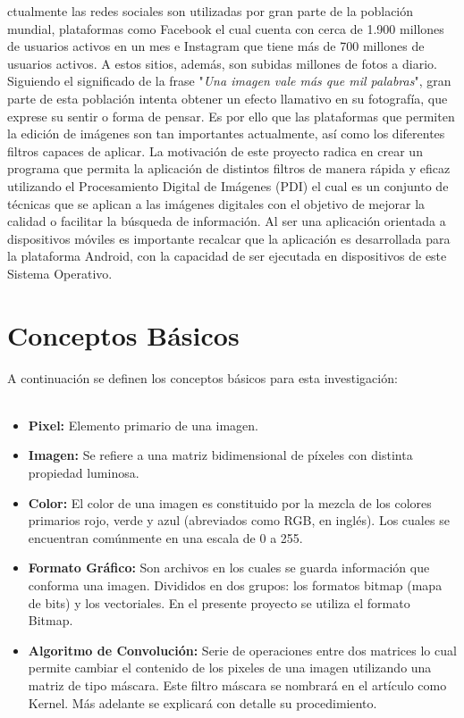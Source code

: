 \documentclass[journal]{IEEEtran}
\begin{document}
ctualmente las redes sociales son utilizadas por gran parte de la población mundial, plataformas como Facebook el cual cuenta con cerca de 1.900 millones de usuarios activos en un mes e Instagram que tiene más de 700 millones de usuarios activos. A estos sitios, además, son subidas millones de fotos a diario. Siguiendo el significado de la frase "\textit{Una imagen vale más que mil palabras}", gran parte de esta población intenta obtener un efecto llamativo en su fotografía, que exprese su sentir o forma de pensar. Es por ello que las plataformas que permiten la edición de imágenes son tan importantes actualmente, así como los diferentes filtros capaces de aplicar. La motivación de este proyecto radica en crear un programa que permita la aplicación de distintos filtros de manera rápida y eficaz utilizando el Procesamiento Digital de Imágenes (PDI) el cual es un conjunto de técnicas que se aplican a las imágenes digitales con el objetivo de mejorar la calidad o facilitar la búsqueda de información. Al ser una aplicación orientada a dispositivos móviles es importante recalcar que la aplicación es desarrollada para la plataforma Android, con la capacidad de ser ejecutada en dispositivos de este Sistema Operativo. 

 
\section{Conceptos Básicos}

A continuación se definen los conceptos básicos para esta investigación:\\
	\\
	\begin{itemize}
	\item{\bf Pixel:} Elemento primario de una imagen.
	\item{\bf Imagen:} Se refiere a una matriz bidimensional de píxeles con distinta propiedad luminosa.
	\item{\bf Color:} El color de una imagen es constituido por la mezcla de los colores primarios rojo, verde y azul (abreviados como RGB, en inglés). Los cuales se encuentran comúnmente en una escala de 0 a 255.
	\item{\bf Formato Gráfico:}  Son archivos en los cuales se guarda información que conforma una imagen.  Divididos en dos grupos: los formatos bitmap (mapa de bits) y los vectoriales. En el presente proyecto se utiliza el formato Bitmap.
	\item{\bf Algoritmo de Convolución:}  Serie de operaciones entre dos matrices lo cual permite cambiar el contenido de los pixeles de una imagen utilizando una matriz de tipo máscara. Este filtro máscara se nombrará en el artículo como Kernel. Más adelante se explicará con detalle su procedimiento.
	\end{itemize}
\end{document}
